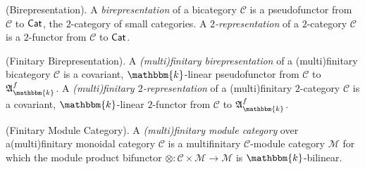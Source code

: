 \noindent\begin{definition}\textup{(Birepresentation).} A {\em birepresentation} of a bicategory $\mathscr{C}$ is a pseudofunctor from $\mathscr{C}$ to $\textup{\textsf{Cat}}$, the $2$-category of small categories. A {\em $2$-representation} of a $2$-category $\mathscr{C}$ is a $2$-functor from $\mathscr{C}$ to $\textup{\textsf{Cat}}$.\\
\end{definition}

\noindent\begin{definition}\textup{(Finitary Birepresentation).} A {\em (multi)finitary birepresentation} of a (multi)finitary bicategory $\mathscr{C}$ is a covariant, $\mathbbm{k}$-linear pseudofunctor from $\mathscr{C}$ to $\mathfrak{A}_\mathbbm{k}^f$. A {\em (multi)finitary $2$-representation} of a (multi)finitary $2$-category $\mathscr{C}$ is a covariant, $\mathbbm{k}$-linear $2$-functor from $\mathscr{C}$ to $\mathfrak{A}_\mathbbm{k}^f$.\\
\end{definition}

\noindent\begin{definition}\textup{(Finitary Module Category).} A {\em (multi)finitary module category} over a\linebreak (multi)finitary monoidal category $\mathcal{C}$ is a multifinitary $\mathcal{C}$-module category $\mathcal{M}$ for which the module product bifunctor $\otimes : \mathcal{C} \times \mathcal{M} \to \mathcal{M}$ is $\mathbbm{k}$-bilinear.\newpage
\end{definition}



